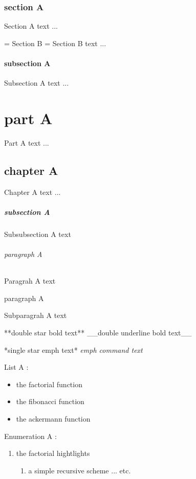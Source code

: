 \section{section A}
Section A text ...

= Section B =
Section B text ...

\subsection{subsection A}
Subsection A text ...

\part{part A}
Part A text ...

\chapter{chapter A}
Chapter A text ...

\subsubsection{subsection A}
Subsubsection A text

\paragraph{paragraph A}
Paragrah A text

\subparagraph{paragraph A}
Subparagrah A text



**double star bold text**
__double underline bold text__

*single star emph text*
\emph{emph command text}


List A :
\begin{itemize}
\item the factorial function
\item the fibonacci function
\item the ackermann function
\end{itemize}

Enumeration A :
\begin{enumerate}
\item the factorial hightlights
\begin{enumerate}
\item a simple recursive scheme
... etc.
\end{enumerate}
\end{enumerate}



